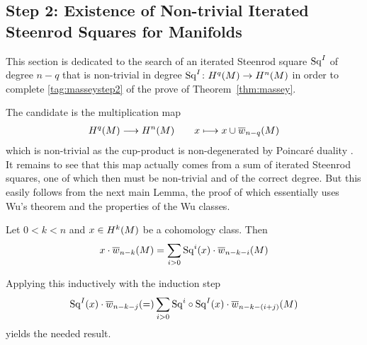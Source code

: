 \subsection[Non-trivial Iterated Steenrod Squares for Manifolds]
{Step 2: Existence of Non-trivial Iterated Steenrod Squares for Manifolds}

This section is dedicated to the search of an iterated Steenrod square
$\mathrm{Sq}^{I}$ of degree $n-q$ that is non-trivial in degree
$\mathrm{Sq}^{I}\colon H^q(M)\to H^n(M)$ in order to complete
\ref{tag:masseystep2} of the prove of Theorem~\ref{thm:massey}.

The candidate is the multiplication map
\begin{gather*}
  H^q(M) \longrightarrow H^n(M)
  \qquad
  x\longmapsto x\cup{\overline{w}_{n-q}}(M)
\end{gather*}
which is non-trivial as the cup-product is non-degenerated
by Poincaré duality \cite[Proposition~3.38]{hatcher}.
It remains to see that this map actually comes from a sum of
iterated Steenrod squares, one of which then must be non-trivial and
of the correct degree.
But this easily follows from the next main Lemma,
the proof of which essentially uses Wu's theorem and the properties of
the Wu classes.

\begin{Lem}\label{lem:masseystep2}
  Let $0<k<n$ and $x\in H^k(M)$ be a cohomology class.
  Then
  \begin{gather*}
    x\cdot{\overline{w}_{n-k}}(M) = \sum_{i>0}\mathrm{Sq}^{i}(x)\cdot{\overline{w}_{n-k-i}}(M)
  \end{gather*}
\end{Lem}
Applying this inductively with the induction step
\begin{gather*}
  \mathrm{Sq}^{I}(x)\cdot{\overline{w}_{n-k-j}}(=) \sum_{i>0}\mathrm{Sq}^{i}\circ\mathrm{Sq}^{I}(x)\cdot{\overline{w}_{n-k-(i+j)}}(M)
\end{gather*}
yields the needed result.

